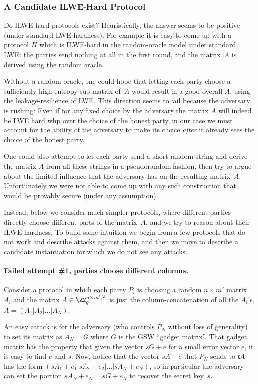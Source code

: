 \subsubsection{A Candidate ILWE-Hard Protocol}
Do ILWE-hard protocols exist? Heuristically, the answer seems to be positive (under standard LWE hardness). For example it is easy to come up with a protocol $\Pi$ which is ILWE-hard in the random-oracle model under standard LWE: the parties send nothing at all in the first round, and the matrix~$A$ is derived using the random oracle.

Without a random oracle, one could hope that letting each party choose a sufficiently high-entropy sub-matrix of~$A$ would result in a good overall $A$, using the leakage-resilience of LWE. This direction seems to fail because the adversary is rushing: Even if for any fixed choice by the adversary the matrix $A$ will indeed be LWE hard whp over the choice of the honest party, in our case we must account for the ability of the adversary to make its choice \emph{after} it already sees the choice of the honest party.

One could also attempt to let each party send a short random string and derive the matrix $A$ from all these strings in a pseudorandom fashion, then try to argue about the limited influence that the adversary has on the resulting matrix~$A$. Unfortunately we were not able to come up with any such construction that would be provably secure (under any assumption).

Instead, below we consider much simpler protocols, where different parties directly choose different parts of the matrix~$A$, and we try to reason about their ILWE-hardness. To build some intuition we begin from a few protocols that do not work and describe attacks against them, and then we move to describe a candidate instantiation for which we do not see any attacks.

\paragraph{Failed attempt \#1, parties choose different columns.}
Consider a protocol in which each party $P_i$ is choosing a random $n\times m'$ matrix $A_i$ and the matrix $A\in \ZZ_q^{n\times m'N}$ is just the column-concatenation of all the $A_i$'s, $A=(A_1|A_2|\ldots|A_N)$.

An easy attack is for the adversary (who controls $P_N$ without loss of generality) to set its matrix as $A_N=G$ where $G$ is the GSW ``gadget matrix''. That gadget matrix has the property that given the vector $sG+e$ for a small error vector $e$, it is easy to find $e$ and $s$. Now, notice that the vector $sA+e$ that $P_N$ sends to ${\sf r}\!{\cal A}$ has the form $(sA_1+e_1|sA_2+e_2|\ldots|sA_N+e_N)$, so in particular the adversary can set the portion $sA_N+e_N=sG+e_N$ to recover the secret key~$s$.

